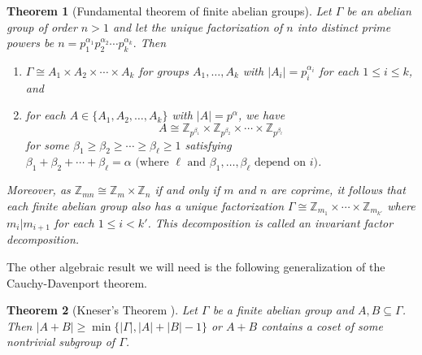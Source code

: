 \documentclass{article}
\newcommand\ZZ{{\mathbb Z}}
\newcommand{\se}{\subseteq}
\newtheorem{theorem}{Theorem}[section]
\newtheorem{lemma}[theorem]{Lemma}
\theoremstyle{definition}
\begin{document}
\begin{theorem}[Fundamental theorem of finite abelian groups\cite{dummit2004}]\label{thm:bascigroupthm}
 Let $\Gamma$ be an abelian group of order $n > 1$ and let the unique factorization of $n$ into distinct prime powers be
 $n = p_1^{\alpha_1} p_2^{\alpha_2} \cdots p_k^{\alpha_k}.$
 Then
\begin{enumerate}
    \item $\Gamma \cong A_1 \times A_2 \times \cdots \times A_k$ for groups $A_1, \dots, A_k$ with $|A_i| = p_i^{\alpha_i}$ for each $1\leq i\leq k$, and 
    
    \item for each $A \in \{A_1, A_2, \ldots, A_k\}$ with $|A| = p^{\alpha}$, we have
    \[
    A \cong \mathbb{Z}_{p^{\beta_1}} \times \mathbb{Z}_{p^{\beta_2}} \times \cdots \times \mathbb{Z}_{p^{\beta_\ell}}
    \]
    for some $\beta_1 \geq \beta_2 \geq \cdots \geq \beta_\ell \geq 1$ satisfying
    $\beta_1 + \beta_2 + \cdots + \beta_\ell = \alpha \text{ (where $\ell$ and $\beta_1, \ldots, \beta_\ell$ depend on $i$)}$. 
\end{enumerate}

Moreover, as $\ZZ_{mn} \cong \ZZ_m \times \ZZ_n$ if and only if $m$ and $n$ are coprime, it follows that each finite abelian group also has a unique factorization $\Gamma \cong \ZZ_{m_1} \times  \cdots \times \ZZ_{m_{k'}}$ where $m_i | m_{i + 1}$ for each $1 \le i < k'$. This decomposition is called an \emph{invariant factor decomposition}.
\end{theorem}


The other algebraic result we will need is the following generalization of the Cauchy-Davenport theorem.

\begin{theorem}[Kneser's Theorem \cite{Kneser_1953}]\label{Kneser}
Let $\Gamma$ be a finite abelian group and $A,B\se \Gamma$. Then $|A+B|\geq \min\{|\Gamma|, |A|+|B|-1\}$ or $A+B$ contains a coset of some nontrivial subgroup of $\Gamma$.
\end{theorem}


    
\end{document}
